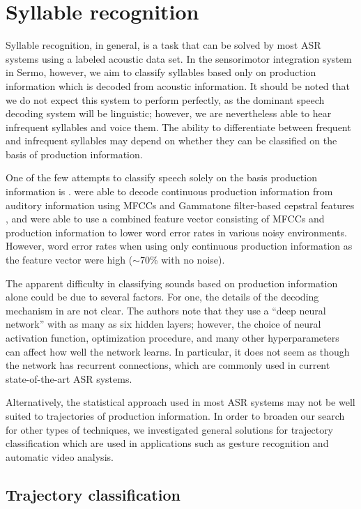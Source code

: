 \section{Syllable recognition}

Syllable recognition, in general,
is a task that can be solved
by most ASR systems
using a labeled acoustic data set.
In the sensorimotor integration system
in Sermo, however,
we aim to classify syllables
based only on production information
which is decoded from acoustic information.
It should be noted that we do not expect
this system to perform perfectly,
as the dominant speech decoding system
will be linguistic;
however, we are nevertheless able
to hear infrequent syllables
and voice them.
The ability to differentiate
between frequent and infrequent syllables
may depend on whether they
can be classified
on the basis of production information.

One of the few attempts to classify speech
solely on the basis production information
is \citet{mitra2014}.
\citeauthor{mitra2014} were able to
decode continuous production information
from auditory information
using MFCCs and Gammatone filter-based
cepstral features \citep{mitra2012},
and were able to use a combined feature vector
consisting of MFCCs and production information
to lower word error rates
in various noisy environments.
However, word error rates
when using only continuous production information
as the feature vector
were high ($\sim$70\% with no noise).

The apparent difficulty
in classifying sounds based on
production information alone
could be due to several factors.
For one, the details of the decoding mechanism
in \citet{mitra2014} are not clear.
The authors note that they use a
``deep neural network''
with as many as six hidden layers;
however, the choice of neural activation function,
optimization procedure,
and many other hyperparameters
can affect how well the network learns.
In particular, it does not seem as though
the network has recurrent connections,
which are commonly used in
current state-of-the-art ASR systems.

Alternatively, the statistical approach
used in most ASR systems
may not be well suited to
trajectories of production information.
In order to broaden our search
for other types of techniques,
we investigated general solutions
for trajectory classification
which are used in applications
such as gesture recognition
and automatic video analysis.

\subsection{Trajectory classification}
\label{sec:prev-classification}

